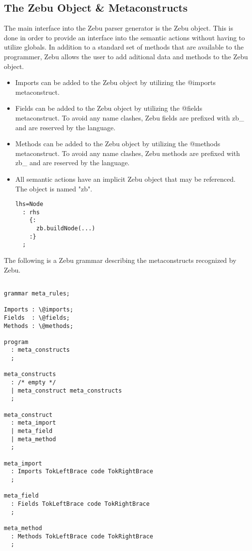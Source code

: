 \documentclass[12pt]{article}
\begin{document}
\subsection{The Zebu Object \& Metaconstructs}

The main interface into the Zebu parser generator is the Zebu object. This is done in order to provide an interface into the semantic actions without having to utilize globals. In addition to a standard set of methods that are available to the programmer, Zebu allows the user to add aditional data and methods to the Zebu object.

\begin{itemize}

\item Imports can be added to the Zebu object by utilizing the @imports metaconstruct. 

\item Fields can be added to the Zebu object by utilizing the @fields metaconstruct. To avoid any name clashes, Zebu fields are prefixed with zb\_ and are reserved by the language.

\item Methods can be added to the Zebu object by utilizing the @methods metaconstruct. To avoid any name clashes, Zebu methods are prefixed with zb\_ and are reserved by the language.

\item All semantic actions have an implicit Zebu object that may be referenced. The object is named "zb".

\begin{verbatim}
lhs=Node
  : rhs
    {: 
      zb.buildNode(...)
    :}
  ;
\end{verbatim}

\end{itemize}

The following is a Zebu grammar describing the metaconstructs recognized by Zebu.

\begin{verbatim}

grammar meta_rules;

Imports : \@imports;
Fields  : \@fields;
Methods : \@methods;

program 
  : meta_constructs
  ;

meta_constructs
  : /* empty */
  | meta_construct meta_constructs
  ;

meta_construct
  : meta_import
  | meta_field
  | meta_method
  ;

meta_import 
  : Imports TokLeftBrace code TokRightBrace
  ;

meta_field 
  : Fields TokLeftBrace code TokRightBrace
  ;

meta_method 
  : Methods TokLeftBrace code TokRightBrace
  ;

\end{verbatim}
\end{document}
